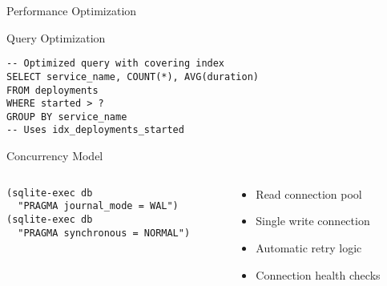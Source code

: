 \documentclass[presentation,aspectratio=169]{beamer}
\begin{document}
\begin{frame}[label={sec:org0afb0bd},fragile]{Performance Optimization}
\begin{block}{Query Optimization}
\begin{verbatim}
-- Optimized query with covering index
SELECT service_name, COUNT(*), AVG(duration)
FROM deployments
WHERE started > ?
GROUP BY service_name
-- Uses idx_deployments_started
\end{verbatim}
\end{block}
\begin{block}{Concurrency Model}
\begin{columns}
\begin{column}{0.5\columnwidth}
\begin{verbatim}
(sqlite-exec db
  "PRAGMA journal_mode = WAL")
(sqlite-exec db
  "PRAGMA synchronous = NORMAL")
\end{verbatim}
\end{column}
\begin{column}{0.5\columnwidth}
\begin{itemize}
\item Read connection pool
\item Single write connection
\item Automatic retry logic
\item Connection health checks
\end{itemize}
\end{column}
\end{columns}
\end{block}
\end{frame}
\end{document}
